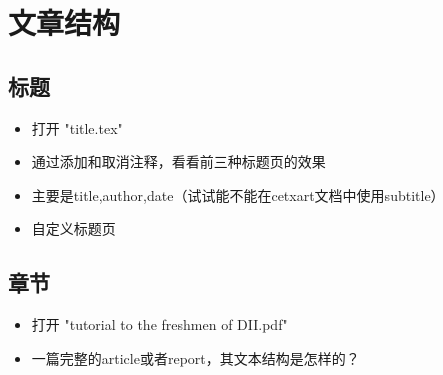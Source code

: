 \section{文章结构}

\subsection{标题}
	\begin{frame}
		\begin{itemize}
			\item 打开 "title.tex"
			\item 通过添加和取消注释，看看前三种标题页的效果
			\item 主要是title,author,date（试试能不能在cetxart文档中使用subtitle）
			\item 自定义标题页
		\end{itemize}
	\end{frame}


\subsection{章节}
	\begin{frame}
		\begin{itemize}
			\item 打开 "tutorial to the freshmen of DII.pdf"
			\item 一篇完整的article或者report，其文本结构是怎样的？
		\end{itemize}
	\end{frame}
	
